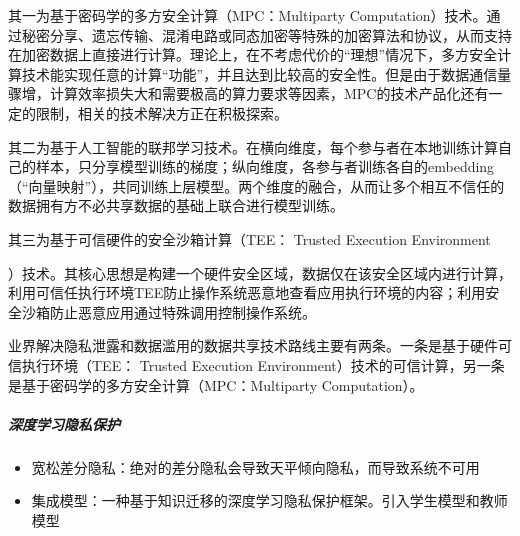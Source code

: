 \documentclass[letterpaper,10pt,english]{sphinxmanual}
\begin{document}
其一为基于密码学的多方安全计算（MPC：Multi\sphinxhyphen{}party
Computation）技术。通过秘密分享、遗忘传输、混淆电路或同态加密等特殊的加密算法和协议，从而支持在加密数据上直接进行计算。理论上，在不考虑代价的“理想”情况下，多方安全计算技术能实现任意的计算“功能”，并且达到比较高的安全性。但是由于数据通信量骤增，计算效率损失大和需要极高的算力要求等因素，MPC的技术产品化还有一定的限制，相关的技术解决方正在积极探索。

其二为基于人工智能的联邦学习技术。在横向维度，每个参与者在本地训练计算自己的样本，只分享模型训练的梯度；纵向维度，各参与者训练各自的embedding（“向量映射”），共同训练上层模型。两个维度的融合，从而让多个相互不信任的数据拥有方不必共享数据的基础上联合进行模型训练。

其三为基于可信硬件的安全沙箱计算（TEE： Trusted Execution
Environment%
\begin{footnote}[913]\sphinxAtStartFootnote
{}
%
\end{footnote}）技术。其核心思想是构建一个硬件安全区域，数据仅在该安全区域内进行计算，利用可信任执行环境TEE防止操作系统恶意地查看应用执行环境的内容；利用安全沙箱防止恶意应用通过特殊调用控制操作系统。

业界解决隐私泄露和数据滥用的数据共享技术路线主要有两条。一条是基于硬件可信执行环境（TEE：
Trusted Execution
Environment）技术的可信计算，另一条是基于密码学的多方安全计算（MPC：Multi\sphinxhyphen{}party
Computation）。%
\begin{footnote}[914]\sphinxAtStartFootnote
{}
%
\end{footnote}


\subparagraph{深度学习隐私保护}
\label{\detokenize{chapter_data_dive/private:id4}}\begin{itemize}
\item {} 
宽松差分隐私：绝对的差分隐私会导致天平倾向隐私，而导致系统不可用

\item {} 
集成模型：一种基于知识迁移的深度学习隐私保护框架。引入学生模型和教师模型%
\begin{footnote}[915]\sphinxAtStartFootnote
{}
%
\end{footnote}

\end{itemize}
\end{document}
